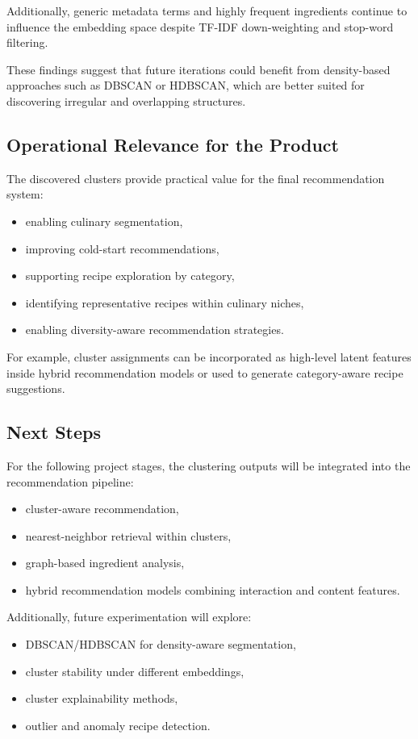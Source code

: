 \documentclass[11pt,a4paper]{article}
\begin{document}
Additionally, generic metadata terms and highly frequent ingredients continue to influence the embedding space despite TF-IDF down-weighting and stop-word filtering.

These findings suggest that future iterations could benefit from density-based approaches such as DBSCAN or HDBSCAN, which are better suited for discovering irregular and overlapping structures.

\subsection{Operational Relevance for the Product}

The discovered clusters provide practical value for the final recommendation system:
\begin{itemize}
    \item enabling culinary segmentation,
    \item improving cold-start recommendations,
    \item supporting recipe exploration by category,
    \item identifying representative recipes within culinary niches,
    \item enabling diversity-aware recommendation strategies.
\end{itemize}

For example, cluster assignments can be incorporated as high-level latent features inside hybrid recommendation models or used to generate category-aware recipe suggestions.

\subsection{Next Steps}

For the following project stages, the clustering outputs will be integrated into the recommendation pipeline:
\begin{itemize}
    \item cluster-aware recommendation,
    \item nearest-neighbor retrieval within clusters,
    \item graph-based ingredient analysis,
    \item hybrid recommendation models combining interaction and content features.
\end{itemize}

Additionally, future experimentation will explore:
\begin{itemize}
    \item DBSCAN/HDBSCAN for density-aware segmentation,
    \item cluster stability under different embeddings,
    \item cluster explainability methods,
    \item outlier and anomaly recipe detection.
\end{itemize}
\end{document}
